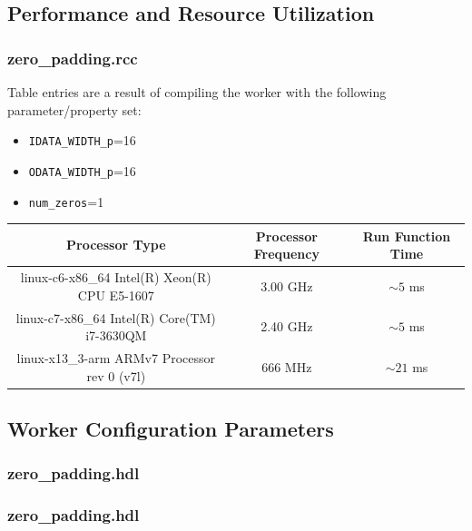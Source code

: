 \documentclass{article}
\def\comp{zero\_padding}
\edef\ecomp{zero_padding}
\begin{document}
\begin{landscape}
\section*{Performance and Resource Utilization}
\subsubsection*{\comp.rcc}
Table entries are a result of compiling the worker with the following parameter/property set:\
\begin{itemize}
	\item \verb+IDATA_WIDTH_p+=16
	\item \verb+ODATA_WIDTH_p+=16
	\item \verb+num_zeros+=1
\end{itemize}
\begin{scriptsize}
	\begin{tabular}{|c|c|c|}
		\hline
		\rowcolor{blue}
		Processor Type                                & Processor Frequency & Run Function Time \\
		\hline
		linux-c6-x86\_64 Intel(R) Xeon(R) CPU E5-1607 & 3.00 GHz            & $\sim5$ ms        \\
		\hline
		linux-c7-x86\_64 Intel(R) Core(TM) i7-3630QM  & 2.40 GHz            & $\sim5$ ms        \\
		\hline
		linux-x13\_3-arm ARMv7 Processor rev 0 (v7l)    & 666 MHz             & $\sim21$ ms       \\
		\hline
	\end{tabular}
\section*{Worker Configuration Parameters}
\subsubsection*{\comp.hdl}

\end{scriptsize}
\subsubsection*{\comp.hdl}

\end{landscape}
\end{document}
